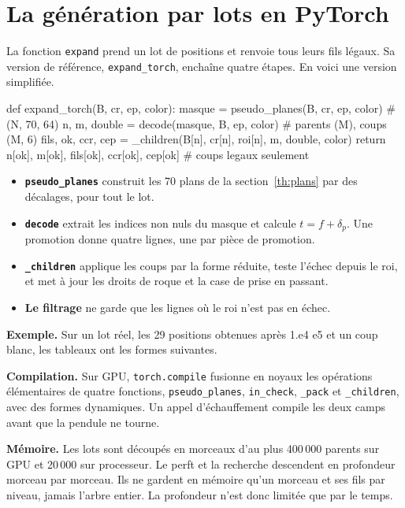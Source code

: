 \documentclass[11pt,a4paper]{article}
\newcommand{\code}[1]{\texttt{#1}}
\newcounter{calcul}
\theoremstyle{plain}
\begin{document}
\section{La génération par lots en PyTorch}

La fonction \code{expand} prend un lot de positions et renvoie tous leurs fils légaux. Sa version
de référence, \code{expand\_torch}, enchaîne quatre étapes. En voici une version simplifiée.

\begin{python}
def expand_torch(B, cr, ep, color):
    masque = pseudo_planes(B, cr, ep, color)           # (N, 70, 64)
    n, m, double = decode(masque, B, ep, color)        # parents (M), coups (M, 6)
    fils, ok, ccr, cep = _children(B[n], cr[n], roi[n], m, double, color)
    return n[ok], m[ok], fils[ok], ccr[ok], cep[ok]    # coups legaux seulement
\end{python}

\begin{itemize}
\item \textbf{\code{pseudo\_planes}} construit les 70 plans de la section~\ref{th:plans} par des
décalages, pour tout le lot.
\item \textbf{\code{decode}} extrait les indices non nuls du masque et calcule $t = f +
\delta_p$. Une promotion donne quatre lignes, une par pièce de promotion.
\item \textbf{\code{\_children}} applique les coups par la forme réduite, teste l'échec depuis le
roi, et met à jour les droits de roque et la case de prise en passant.
\item \textbf{Le filtrage} ne garde que les lignes où le roi n'est pas en échec.
\end{itemize}

\textbf{Exemple.} Sur un lot réel, les 29 positions obtenues après 1.e4 e5 et un coup blanc, les
tableaux ont les formes suivantes.
\begin{center}\small\unskip\end{center}

\textbf{Compilation.} Sur GPU, \code{torch.compile} fusionne en noyaux les opérations
élémentaires de quatre fonctions, \code{pseudo\_planes}, \code{in\_check}, \code{\_pack} et
\code{\_children}, avec des formes dynamiques. Un appel d'échauffement compile les deux camps avant que la pendule ne tourne.

\textbf{Mémoire.} Les lots sont découpés en morceaux d'au plus 400\,000 parents sur GPU et
20\,000 sur processeur. Le perft et la recherche descendent en profondeur morceau par morceau. Ils
ne gardent en mémoire qu'un morceau et ses fils par niveau, jamais l'arbre entier. La profondeur
n'est donc limitée que par le temps.
\end{document}
